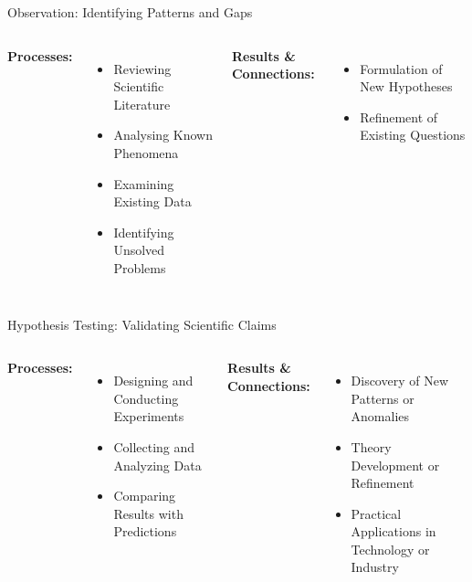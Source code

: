 \begin{frame}{Observation: Identifying Patterns and Gaps}
  \begin{columns}
    \textbf{Processes:}
    \begin{itemize}
      \item Reviewing Scientific Literature
      \item Analysing Known Phenomena
      \item Examining Existing Data
      \item Identifying Unsolved Problems
    \end{itemize}

    \textbf{Results \& Connections:}
    \begin{itemize}
      \item Formulation of New Hypotheses
      \item Refinement of Existing Questions
      \vspace{1.81cm}
    \end{itemize}
  \end{columns}
\end{frame}

\begin{frame}{Hypothesis Testing: Validating Scientific Claims}
  \begin{columns}
    \textbf{Processes:}
    \begin{itemize}
      \item Designing and Conducting Experiments
      \item Collecting and Analyzing Data
      \item Comparing Results with Predictions
    \end{itemize}

    \textbf{Results \& Connections:}
    \begin{itemize}
      \item Discovery of New Patterns or Anomalies
      \item Theory Development or Refinement
      \item Practical Applications in Technology or Industry
    \end{itemize}
  \end{columns}
\end{frame}

